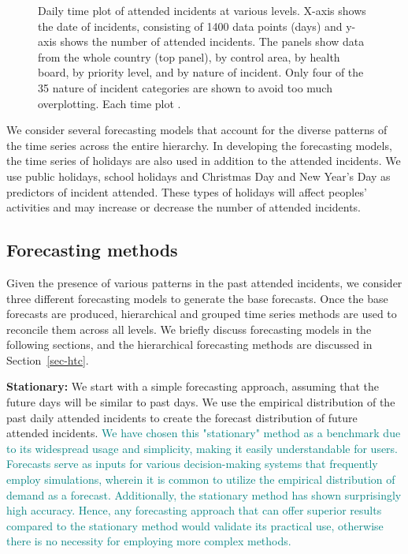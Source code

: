 \documentclass[
  authoryear,
  preprint,
  3p]{elsarticle}
\begin{document}
\begin{figure}


\caption{\label{fig-dataviz2}Daily time plot of attended incidents at
various levels. X-axis shows the date of incidents, consisting of 1400
data points (days) and y-axis shows the number of attended incidents.
The panels show data from the whole country (top panel), by control
area, by health board, by priority level, and by nature of incident.
Only four of the 35 nature of incident categories are shown to avoid too
much overplotting. Each time plot .}

\end{figure}%

We consider several forecasting models that account for the diverse
patterns of the time series across the entire hierarchy. In developing
the forecasting models, the time series of holidays are also used in
addition to the attended incidents. We use public holidays, school
holidays and Christmas Day and New Year's Day as predictors of incident
attended. These types of holidays will affect peoples' activities and
may increase or decrease the number of attended incidents.

\subsection{Forecasting methods}\label{forecasting-methods}

Given the presence of various patterns in the past attended incidents,
we consider three different forecasting models to generate the base
forecasts. Once the base forecasts are produced, hierarchical and
grouped time series methods are used to reconcile them across all
levels. We briefly discuss forecasting models in the following sections,
and the hierarchical forecasting methods are discussed in
Section~\ref{sec-htc}.

\textbf{Stationary:} We start with a simple forecasting approach,
assuming that the future days will be similar to past days. We use the
empirical distribution of the past daily attended incidents to create
the forecast distribution of future attended incidents.
\textcolor{teal}{We have chosen this "stationary" method as a benchmark due to its widespread usage and simplicity, making it easily understandable for users. Forecasts serve as inputs for various decision-making systems that frequently employ simulations, wherein it is common to utilize the empirical distribution of demand as a forecast. Additionally, the stationary method has shown surprisingly high accuracy. Hence, any forecasting approach that can offer superior results compared to the stationary method would validate its practical use, otherwise there is no necessity for employing more complex methods.}
\end{document}
